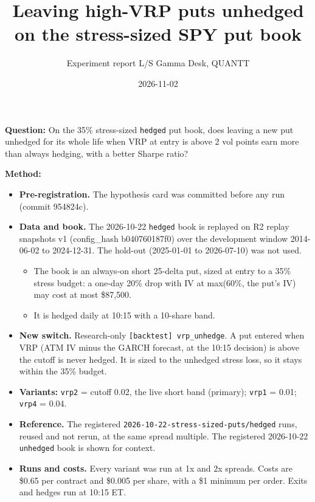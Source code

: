 \documentclass{article}
\title{Leaving high-VRP puts unhedged on the stress-sized SPY put book}
\author{Experiment report \textperiodcentered{} L/S Gamma Desk, QUANTT}
\date{2026-11-02}
\begin{document}
\maketitle

\textbf{Question:} On the 35\% stress-sized \texttt{hedged} put book, does leaving a new put unhedged for its whole life when VRP at entry is above 2 vol points earn more than always hedging, with a better Sharpe ratio?

\textbf{Method:}

\begin{itemize}

\item \textbf{Pre-registration.} The hypothesis card was committed before any run (commit 954824c).

\item \textbf{Data and book.} The 2026-10-22 \texttt{hedged} book is replayed on R2 replay snapshots v1 (config\_hash b040760187f0) over the development window 2014-06-02 to 2024-12-31. The hold-out (2025-01-01 to 2026-07-10) was not used.

\begin{itemize}

\item The book is an always-on short 25-delta put, sized at entry to a 35\% stress budget: a one-day 20\% drop with IV at max(60\%, the put's IV) may cost at most \$87,500.

\item It is hedged daily at 10:15 with a 10-share band.

\end{itemize}

\item \textbf{New switch.} Research-only \texttt{[backtest] vrp\_\allowbreak{}unhedge}. A put entered when VRP (ATM IV minus the GARCH forecast, at the 10:15 decision) is above the cutoff is never hedged. It is sized to the unhedged stress loss, so it stays within the 35\% budget.

\item \textbf{Variants:} \texttt{vrp2} = cutoff 0.02, the live short band (primary); \texttt{vrp1} = 0.01; \texttt{vrp4} = 0.04.

\item \textbf{Reference.} The registered \texttt{2026-\allowbreak{}10-\allowbreak{}22-\allowbreak{}stress-\allowbreak{}sized-\allowbreak{}puts/\allowbreak{}hedged} runs, reused and not rerun, at the same spread multiple. The registered 2026-10-22 \texttt{unhedged} book is shown for context.

\item \textbf{Runs and costs.} Every variant was run at 1x and 2x spreads. Costs are \$0.65 per contract and \$0.005 per share, with a \$1 minimum per order. Exits and hedges run at 10:15 ET.

\end{itemize}
\end{document}

